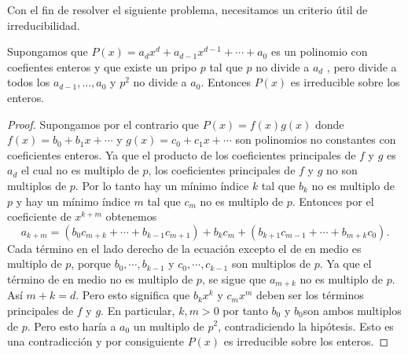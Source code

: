 Con el fin de resolver el siguiente problema, necesitamos un criterio útil de irreducibilidad.

\begin{definition}\label{eisenstein}
    Supongamos que $P(x) = a_d x^d + a_{d - 1} x^{d - 1} + \cdots + a_0$ es un polinomio con coefientes enteros y que existe un pripo $p$ tal que $p$ no divide a $a_d$ , pero divide a todos los $a_{d - 1}, \ldots, a_0$ y $p^2$ no divide a $a_0$.
    Entonces $P(x)$ es irreducible sobre los enteros.
\end{definition}
\begin{proof}
    Supongamos por el contrario que $P(x) = f(x) g(x)$ donde $f(x) = b_0 + b_1 x + \cdots$ y $g(x) = c_0 + c_1 x + \cdots$ son polinomios no constantes con coeficientes enteros.
    Ya que el producto de los coeficientes principales de $f$ y $g$ es $a_d$ el cual no es multiplo de $p$, los coeficientes principales de $f$ y $g$ no son multiplos de $p$.
    Por lo tanto hay un mínimo índice $k$ tal que $b_k$ no es multiplo de $p$ y hay un mínimo índice $m$ tal que $c_m$ no es multiplo de $p$.
    Entonces por el coeficiente de $x^{k + m}$ obtenemos
    \[
        a_{k + m} = (b_0 c_{m + k} + \cdots + b_{k - 1} c_{m + 1}) + b_k c_m + (b_{k + 1} c_{m - 1} + \cdots + b_{m + k} c_0).
    \]
    Cada término en el lado derecho de la ecuación excepto el de en medio es multiplo de $p$, porque $b_0, \cdots, b_{k - 1}$ y $c_0, \cdots, c_{k - 1}$ son multiplos de $p$.
    Ya que el término de en medio no es multiplo de $p$, se sigue que $a_{m + k}$ no es multiplo de $p$.
    Así $m + k = d$.
    Pero esto significa que $b_k x^k$ y $c_m x^m$ deben ser los términos principales de $f$ y $g$.
    En particular, $k,m > 0$ por tanto $b_0$ y $b_0$son ambos multiplos de $p$.
    Pero esto haría a $a_0$ un multiplo de $p^2$, contradiciendo la hipótesis.
    Esto es una contradicción y por consiguiente $P(x)$ es irreducible sobre los enteros.
\end{proof}

